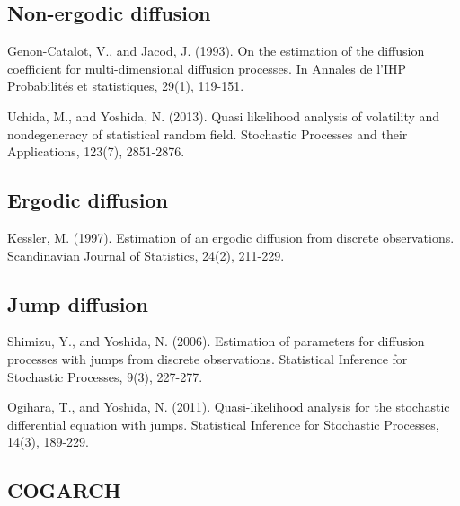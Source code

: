 \begin{thebibliography}{00}
\subsection{Non-ergodic diffusion}

Genon-Catalot, V., and Jacod, J. (1993). 
\newblock On the estimation of the diffusion coefficient for multi-dimensional diffusion processes. 
\newblock In Annales de l'IHP Probabilités et statistiques, 29(1), 119-151.

Uchida, M., and Yoshida, N. (2013). 
\newblock Quasi likelihood analysis of volatility and nondegeneracy of statistical random field. 
\newblock Stochastic Processes and their Applications, 123(7), 2851-2876.

\subsection{Ergodic diffusion}

Kessler, M. (1997). 
\newblock Estimation of an ergodic diffusion from discrete observations. 
\newblock Scandinavian Journal of Statistics, 24(2), 211-229.

\subsection{Jump diffusion}

Shimizu, Y., and Yoshida, N. (2006). 
\newblock Estimation of parameters for diffusion processes with jumps from discrete observations. 
\newblock Statistical Inference for Stochastic Processes, 9(3), 227-277.

Ogihara, T., and Yoshida, N. (2011). 
\newblock Quasi-likelihood analysis for the stochastic differential equation with jumps. 
\newblock Statistical Inference for Stochastic Processes, 14(3), 189-229.

\subsection{COGARCH}


\end{thebibliography}
